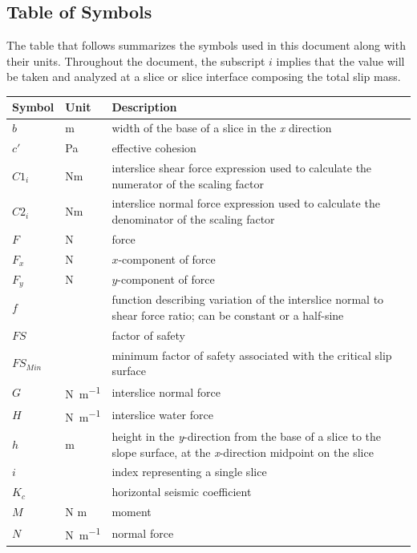 \documentclass[12pt]{article}
\renewcommand{\arraystretch}{1}
\begin{document}
\subsection{Table of Symbols}


The table that follows summarizes the symbols used in this document along with 
their units. 
Throughout the document, the subscript $i$ implies that the value will be taken 
and analyzed at a slice or slice interface composing the total slip mass.

\renewcommand{\arraystretch}{1.6}
\setlength{\tabcolsep}{20pt}
\begin{longtable*}{  l  l  p{8.5cm}  }
\hline
\textbf{Symbol} & \textbf{Unit} & \textbf{Description} \\
\hline
$b$ & \si{\meter}& width of the base of a slice in the \textit{x} direction
\\
$c'$ & \si{\pascal} & effective cohesion 
\\
${C1_{i}}$ &  N\si{\meter}& interslice shear force expression used to calculate 
the numerator of the scaling factor
\\
${C2_{i}}$ &  N\si{\meter}& interslice normal force expression used to 
calculate the denominator of the scaling factor
\\
$F$ &\si{\newton} & force
\\
${F_{x}}$ & \si{\newton} &$x$-component of force
\\
${F_{y}}$ & \si{\newton} &$y$-component of force
\\
$f$ & & function describing variation of the interslice normal to shear force 
ratio; can be constant or a half-sine
\\
$FS$ & & factor of safety
\\
$FS_{Min}$ & & minimum factor of safety associated with the critical slip 
surface
\\
$G$ & \si{\newton\per\meter} & interslice normal force
\\
$H$ & \si{\newton\per\meter} & interslice water force
\\
$h$ &  \si{\meter}& height in the \textit{y}-direction from the base of a slice 
to the slope surface, at the \textit{x}-direction midpoint on the slice
\\
$i$ & & index representing a single slice 
\\
${K_{c}}$ & & horizontal seismic coefficient
\\
$M$ & N \si{\meter}& moment
\\
$N$ & \si{\newton\per\meter} & normal force
\\

\end{longtable*}
\end{document}
